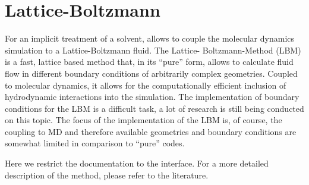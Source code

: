 %  
%   
%  
%  
%

\chapter{Lattice-Boltzmann}
\label{sec:lb}

For an implicit treatment of a solvent, \es allows to couple the
molecular dynamics simulation to a Lattice-Boltzmann fluid. The Lattice-
Boltzmann-Method (LBM) is a fast, lattice based method that, in its
``pure'' form, allows to calculate fluid flow in different boundary conditions
of arbitrarily complex geometries. Coupled to molecular dynamics, it allows for 
the computationally efficient inclusion of hydrodynamic interactions into the 
simulation. The implementation of boundary conditions for the LBM is a difficult
 task, a lot of research is still being conducted on this topic. The focus of 
the \es implementation of the LBM is, of course, the coupling to MD and 
therefore available geometries and boundary conditions are somewhat limited 
in comparison to ``pure'' codes. 

Here we restrict the documentation to the interface. For a more detailed
description of the method, please refer to the literature.

